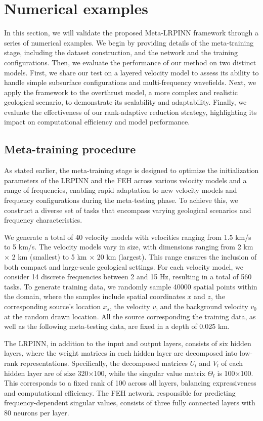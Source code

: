 \section{\textbf{Numerical examples}}\label{examples}
In this section, we will validate the proposed Meta-LRPINN framework through a series of numerical examples. We begin by providing details of the meta-training stage, including the dataset construction, and the network and the training configurations. Then, we evaluate the performance of our method on two distinct models. First, we share our test on a layered velocity model to assess its ability to handle simple subsurface configurations and multi-frequency wavefields. Next, we apply the framework to the overthrust model, a more complex and realistic geological scenario, to demonstrate its scalability and adaptability. Finally, we evaluate the effectiveness of our rank-adaptive reduction strategy, highlighting its impact on computational efficiency and model performance.

\subsection{Meta-training procedure}\label{example1}
As stated earlier, the meta-training stage is designed to optimize the initialization parameters of the LRPINN and the FEH across various velocity models and a range of frequencies, enabling rapid adaptation to new velocity models and frequency configurations during the meta-testing phase. To achieve this, we construct a diverse set of tasks that encompass varying geological scenarios and frequency characteristics.

We generate a total of 40 velocity models with velocities ranging from 1.5 km/s to 5 km/s. The velocity models vary in size, with dimensions ranging from 2 km $\times$ 2 km (smallest) to 5 km × 20 km (largest). This range ensures the inclusion of both compact and large-scale geological settings. For each velocity model, we consider 14 discrete frequencies between 2 and 15 Hz, resulting in a total of 560 tasks. To generate training data, we randomly sample 40000 spatial points within the domain, where the samples include spatial coordinates $x$ and $z$, the corresponding source's location $x_s$, the velocity $v$, and the background velocity $v_0$ at the random drawn location. All the source corresponding the training data, as well as the following meta-testing data, are fixed in a depth of 0.025 km. 

The LRPINN, in addition to the input and output layers, consists of six hidden layers, where the weight matrices in each hidden layer are decomposed into low-rank representations. Specifically, the decomposed matrices $U_l$ and $V_l$ of each hidden layer are of size 320$\times$100, while the singular value matrix $\Theta_l$ is 100$\times$100. This corresponds to a fixed rank of 100 across all layers, balancing expressiveness and computational efficiency. The FEH network, responsible for predicting frequency-dependent singular values, consists of three fully connected layers with 80 neurons per layer. 

